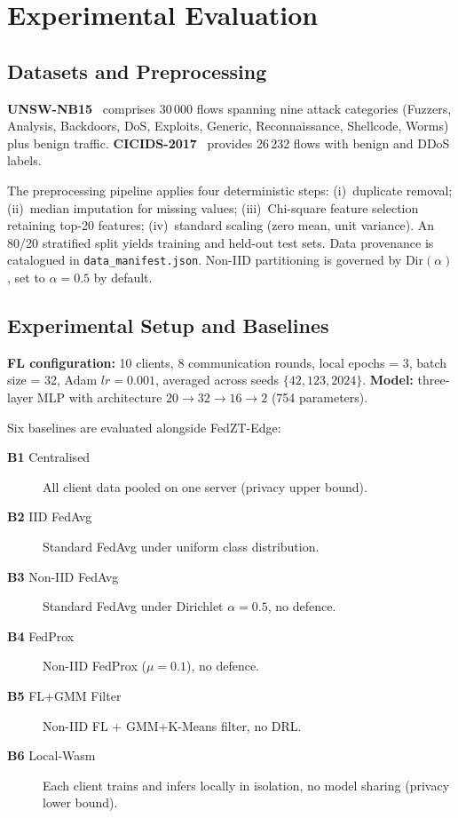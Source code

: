 \documentclass[sn-mathphys,Numbered]{sn-jnl}
\begin{document}
\section{Experimental Evaluation}\label{sec:experiments}

\subsection{Datasets and Preprocessing}\label{sec:data}
\textbf{UNSW-NB15}~\cite{moustafa2015} comprises 30\,000 flows spanning nine attack categories (Fuzzers, Analysis, Backdoors, DoS, Exploits, Generic, Reconnaissance, Shellcode, Worms) plus benign traffic. \textbf{CICIDS-2017}~\cite{sharafaldin2018} provides 26\,232 flows with benign and DDoS labels.

The preprocessing pipeline applies four deterministic steps: (i)~duplicate removal; (ii)~median imputation for missing values; (iii)~Chi-square feature selection retaining top-20 features; (iv)~standard scaling (zero mean, unit variance). An 80/20 stratified split yields training and held-out test sets. Data provenance is catalogued in \texttt{data\_manifest.json}. Non-IID partitioning is governed by $\text{Dir}(\alpha)$, set to $\alpha=0.5$ by default.

\subsection{Experimental Setup and Baselines}\label{sec:setup}
\textbf{FL configuration:} 10 clients, 8 communication rounds, local epochs = 3, batch size = 32, Adam $lr=0.001$, averaged across seeds $\{42, 123, 2024\}$. \textbf{Model:} three-layer MLP with architecture $20 \to 32 \to 16 \to 2$ (754 parameters).

Six baselines are evaluated alongside FedZT-Edge:
\begin{description}
  \item[\textbf{B1} Centralised] All client data pooled on one server (privacy upper bound).
  \item[\textbf{B2} IID FedAvg] Standard FedAvg under uniform class distribution.
  \item[\textbf{B3} Non-IID FedAvg] Standard FedAvg under Dirichlet $\alpha{=}0.5$, no defence.
  \item[\textbf{B4} FedProx] Non-IID FedProx ($\mu{=}0.1$), no defence.
  \item[\textbf{B5} FL+GMM Filter] Non-IID FL + GMM+K-Means filter, no DRL.
  \item[\textbf{B6} Local-Wasm] Each client trains and infers locally in isolation, no model sharing (privacy lower bound).
\end{description}
\end{document}
